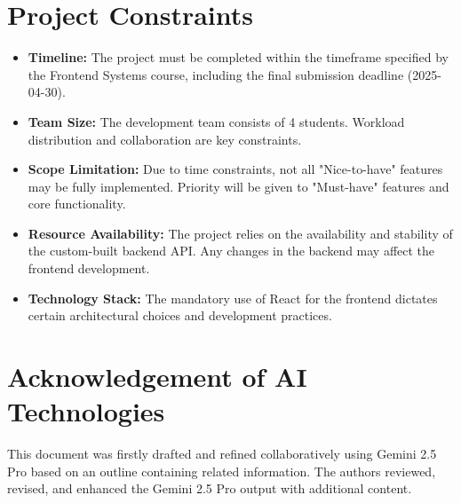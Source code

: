 \documentclass[a4paper,11pt]{article}
\begin{document}
\section{Project Constraints}
\begin{itemize}
    \item \textbf{Timeline:} The project must be completed within the timeframe specified by the Frontend Systems course, including the final submission deadline (2025-04-30).
    \item \textbf{Team Size:} The development team consists of 4 students. Workload distribution and collaboration are key constraints.
    \item \textbf{Scope Limitation:} Due to time constraints, not all "Nice-to-have" features may be fully implemented. Priority will be given to "Must-have" features and core functionality.
    \item \textbf{Resource Availability:} The project relies on the availability and stability of the custom-built backend API. Any changes in the backend may affect the frontend development.
    \item \textbf{Technology Stack:} The mandatory use of React for the frontend dictates certain architectural choices and development practices.
\end{itemize}

\section*{Acknowledgement of AI Technologies}
This document was firstly drafted and refined collaboratively using Gemini 2.5 Pro based on an outline containing related information. The authors reviewed, revised, and enhanced the Gemini 2.5 Pro
output with additional content. 
\end{document}
